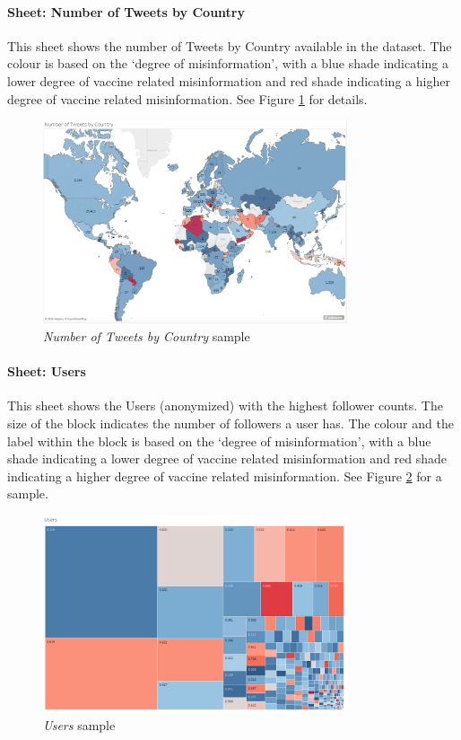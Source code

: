 \documentclass[12pt]{article}
\begin{document}
\paragraph{Sheet: Number of Tweets by Country}
This sheet shows the number of Tweets by Country available in the dataset. The colour is based on the ‘degree of misinformation’, with a blue shade indicating a lower degree of vaccine related misinformation and red shade indicating a higher degree of vaccine related misinformation. See Figure \ref{fig:country} for details.

\begin{figure}[tbp]
\centering 
\includegraphics[width=0.8\textwidth]{figures/country}
\caption{\textit{Number of Tweets by Country} sample} 
\label{fig:country}
\end{figure}


\paragraph{Sheet: Users}
This sheet shows the Users (anonymized) with the highest follower counts. The size of the block indicates the number of followers a user has. The colour and the label within the block is based on the ‘degree of misinformation’, with a blue shade indicating a lower degree of vaccine related misinformation and red shade indicating a higher degree of vaccine related misinformation. See Figure \ref{fig:users} for a sample.

\begin{figure}[tbp]
\centering 
\includegraphics[width=0.8\textwidth]{figures/users}
\caption{\textit{Users} sample} 
\label{fig:users}
\end{figure}
\end{document}
